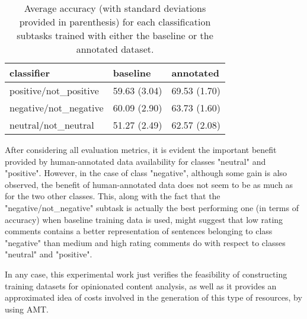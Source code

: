 \begin{table}
\begin{tabular}{|l|l|l|}
\hline
classifier &baseline &annotated \\ 
\hline
positive/not_positive &59.63 (3.04) &69.53 (1.70) \\ 
\hline
negative/not_negative &60.09 (2.90) &63.73 (1.60) \\ 
\hline
neutral/not_neutral &51.27 (2.49) &62.57 (2.08) \\ 
\hline
\end{tabular}
\caption{Average accuracy (with standard deviations provided in parenthesis) 
for each classification subtasks trained with either the baseline or the annotated dataset.}
\label{tc_accu}
\end{table}

After considering all evaluation metrics, it is evident the important benefit provided by human-annotated data 
availability for classes "neutral" and "positive". However, in the case of class "negative", although some 
gain is also observed, the benefit of human-annotated data does not seem to be as much as for the two other 
classes. This, along with the fact that the "negative/not_negative" subtask is actually the best performing
one (in terms of accuracy) when baseline training data is used, might suggest that low rating comments contains 
a better representation of sentences belonging to class "negative" than medium and high rating comments do with
respect to classes "neutral" and "positive". 

In any case, this experimental work just verifies the feasibility of constructing training datasets for
opinionated content analysis, as well as it provides an approximated idea of costs involved in the generation
of this type of resources, by using AMT.


